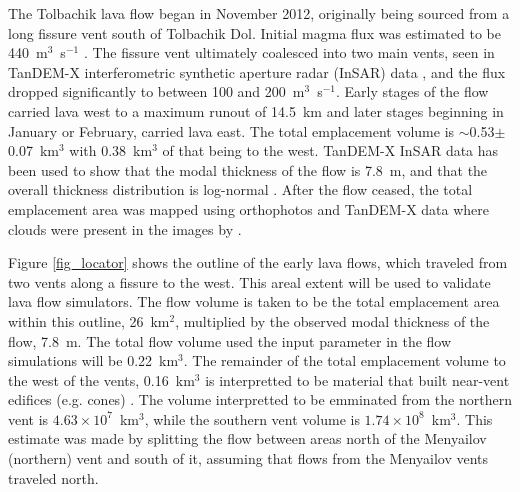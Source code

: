 The Tolbachik lava flow began in November 2012, originally being sourced from a long fissure vent south of Tolbachik Dol. Initial magma flux was estimated to be 440~m$^3$~s$^{-1}$ \citep{belousov2015overview}. The fissure vent ultimately coalesced into two main vents, seen in TanDEM-X interferometric synthetic aperture radar (InSAR) data \citep{kubanek2015lava}, and the flux dropped significantly to between 100 and 200~m$^3$~s$^{-1}$. Early stages of the flow carried lava west to a maximum runout of 14.5~km and later stages beginning in January or February, carried lava east. The total emplacement volume is $\sim$0.53$\pm$0.07~km$^3$ with 0.38~km$^3$ of that being to the west. TanDEM-X InSAR data has been used to show that the modal thickness of the flow is 7.8~m, and that the overall thickness distribution is log-normal \citep{kubanek2015lava}. After the flow ceased, the total emplacement area was mapped using orthophotos and TanDEM-X data where clouds were present in the images by \citet{kubanek2015lava}.

Figure \ref{fig_locator} shows the outline of the early lava flows, which traveled from two vents along a fissure to the west. This areal extent will be used to validate lava flow simulators. The flow volume is taken to be the total emplacement area within this outline, 26~km$^2$, multiplied by the observed modal thickness of the flow, 7.8~m. The total flow volume used the input parameter in the flow simulations will be 0.22~km$^3$. The remainder of the total emplacement volume to the west of the vents, 0.16~km$^3$ is interpretted to be material that built near-vent edifices (e.g. cones) \citep{kubanek2015lava}. The volume interpretted to be emminated from the northern vent is $4.63\times 10^7$~km$^3$, while the southern vent volume is $1.74\times 10^8$~km$^3$. This estimate was made by splitting the flow between areas north of the Menyailov (northern) vent and south of it, assuming that flows from the Menyailov vents traveled north.
	












